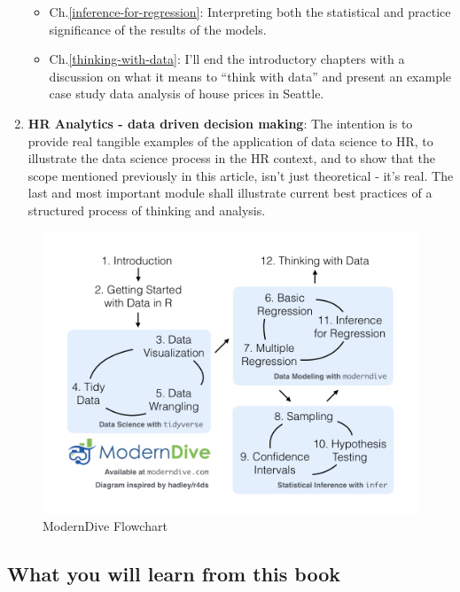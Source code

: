 \documentclass[
  12pt, krantz2,
]{krantz}
\providecommand{\tightlist}{%
  \setlength{\itemsep}{0pt}\setlength{\parskip}{0pt}}
\begin{document}
\begin{enumerate}
  \begin{itemize}
  \tightlist
  \item
    Ch.\ref{inference-for-regression}: Interpreting both the statistical and practice significance of the results of the models.
  \item
    Ch.\ref{thinking-with-data}: I'll end the introductory chapters with a discussion on what it means to ``think with data'' and present an example case study data analysis of house prices in Seattle.
  \end{itemize}
\item
  \textbf{HR Analytics - data driven decision making}: The intention is to provide real tangible examples of the application of data science to HR, to illustrate the data science process in the HR context, and to show that the scope mentioned previously in this article, isn't just theoretical - it's real. The last and most important module shall illustrate current best practices of a structured process of thinking and analysis.
\end{enumerate}

\begin{figure}

{\centering \includegraphics[width=\textwidth]{images/flowcharts/flowchart/flowchart.002} 

}

\caption{ModernDive Flowchart}\label{fig:moderndive-figure}
\end{figure}

\hypertarget{subsec:learning-goals}{%
\subsection{What you will learn from this book}\label{subsec:learning-goals}}
\end{document}
